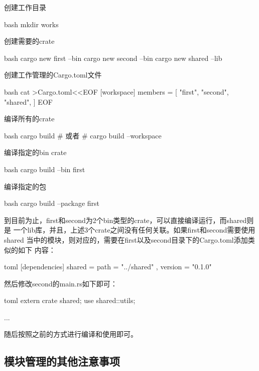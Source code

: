 \begin{outline}[enumerate]
\1 创建工作目录
\begin{code-in-enumerate}{bash}
mkdir works
\end{code-in-enumerate}

\1 创建需要的crate
\begin{code-in-enumerate}{bash}
cargo new first --bin
cargo new second --bin
cargo new shared --lib
\end{code-in-enumerate}

\1 创建工作管理的Cargo.toml文件
\begin{code-in-enumerate}{bash}
cat >Cargo.toml<<EOF
[workspace]
members = [
    "first",
    "second",
    "shared",
]
EOF
\end{code-in-enumerate}

\1 编译所有的crate
\begin{code-in-enumerate}{bash}
cargo build
# 或者
# cargo build --workspace
\end{code-in-enumerate}

\1 编译指定的bin crate
\begin{code-in-enumerate}{bash}
cargo build --bin first
\end{code-in-enumerate}

\1 编译指定的包
\begin{code-in-enumerate}{bash}
cargo build --package first
\end{code-in-enumerate}
\end{outline}

到目前为止，first和second为2个bin类型的crate，可以直接编译运行，而shared则是
一个lib库，并且，上述3个crate之间没有任何关联。如果first和second需要使用shared
当中的模块，则对应的，需要在first以及second目录下的Cargo.toml添加类似的如下
内容：
\begin{code-block}{toml}
[dependencies]
shared = { path = "../shared" , version = "0.1.0"}
\end{code-block}

然后修改second的main.rs如下即可：
\begin{code-block}{toml}
extern crate shared;
use shared::utils;

...
\end{code-block}
随后按照之前的方式进行编译和使用即可。

\subsection{模块管理的其他注意事项}

